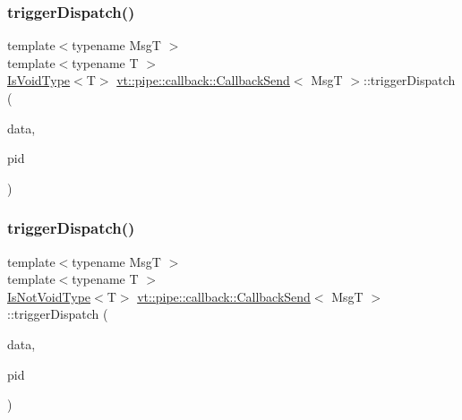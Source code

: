 \subsubsection{\texorpdfstring{trigger\+Dispatch()}{triggerDispatch()}\hspace{0.1cm}{\footnotesize\ttfamily [2/4]}}
{\footnotesize\ttfamily template$<$typename MsgT $>$ \\
template$<$typename T $>$ \\
\hyperlink{structvt_1_1pipe_1_1callback_1_1_callback_send_afbb9475a84ba4a7b3db3c7493672dbe6}{Is\+Void\+Type}$<$T$>$ \hyperlink{structvt_1_1pipe_1_1callback_1_1_callback_send}{vt\+::pipe\+::callback\+::\+Callback\+Send}$<$ MsgT $>$\+::trigger\+Dispatch (\begin{DoxyParamCaption}\item[{\hyperlink{structvt_1_1pipe_1_1callback_1_1_callback_send_a5b21820f25b28f980921b1fe24d8a2dc}{Signal\+Data\+Type} $\ast$}]{data,  }\item[{\hyperlink{namespacevt_ac9852acda74d1896f48f406cd72c7bd3}{Pipe\+Type} const \&}]{pid }\end{DoxyParamCaption})\hspace{0.3cm}{\ttfamily [private]}}

\mbox{\label{structvt_1_1pipe_1_1callback_1_1_callback_send_a2e088285dc2c8eb392fc69404e9613b5}} 
\subsubsection{\texorpdfstring{trigger\+Dispatch()}{triggerDispatch()}\hspace{0.1cm}{\footnotesize\ttfamily [3/4]}}
{\footnotesize\ttfamily template$<$typename MsgT $>$ \\
template$<$typename T $>$ \\
\hyperlink{structvt_1_1pipe_1_1callback_1_1_callback_send_adb85e64e67e00aa71a9c173565dfb7dc}{Is\+Not\+Void\+Type}$<$T$>$ \hyperlink{structvt_1_1pipe_1_1callback_1_1_callback_send}{vt\+::pipe\+::callback\+::\+Callback\+Send}$<$ MsgT $>$\+::trigger\+Dispatch (\begin{DoxyParamCaption}\item[{\hyperlink{structvt_1_1pipe_1_1callback_1_1_callback_send_a5b21820f25b28f980921b1fe24d8a2dc}{Signal\+Data\+Type} $\ast$}]{data,  }\item[{\hyperlink{namespacevt_ac9852acda74d1896f48f406cd72c7bd3}{Pipe\+Type} const \&}]{pid }\end{DoxyParamCaption})\hspace{0.3cm}{\ttfamily [private]}}

